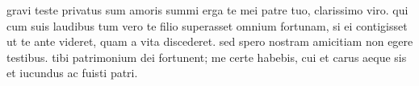 


 gravi teste privatus sum amoris summi erga te mei patre tuo, clarissimo viro. qui cum suis laudibus tum vero te filio superasset omnium fortunam, si ei contigisset ut te ante videret, quam a vita discederet. sed spero nostram amicitiam non egere testibus. tibi patrimonium dei fortunent; me certe habebis, cui et carus aeque sis et iucundus ac fuisti patri.
